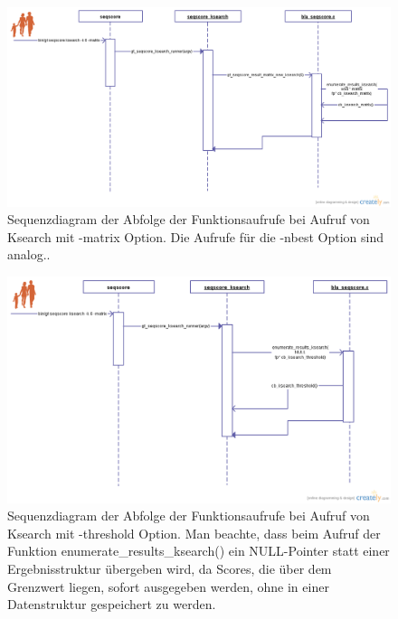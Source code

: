 \documentclass{article}
\begin{document}
\begin{center}
  \begin{figure}
    \includegraphics[width = \linewidth]{img/seqscore_seqence_fam.png}
    \caption{Sequenzdiagram der Abfolge der Funktionsaufrufe bei Aufruf von Ksearch mit -matrix Option. Die Aufrufe für die -nbest Option sind analog..}
    \label{manbes}
  \end{figure}
\end{center}

\begin{center}
  \begin{figure}
    \includegraphics[width = \linewidth]{img/seqscore_sequence_fam_thresh.png}
    \caption{Sequenzdiagram der Abfolge der Funktionsaufrufe bei Aufruf von Ksearch mit -threshold Option. Man beachte, dass beim Aufruf der Funktion
      enumerate\_results\_ksearch() ein NULL-Pointer statt einer Ergebnisstruktur übergeben wird, da Scores, die über dem Grenzwert liegen, sofort ausgegeben
      werden, ohne in einer Datenstruktur gespeichert zu werden.}
    \label{thresh}
  \end{figure}
\end{center}
\end{document}
